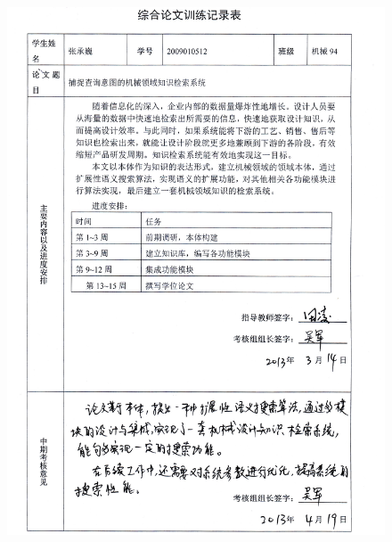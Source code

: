 \documentclass[12pt,a4paper]{article}
\begin{document}
\newpage
\begin{figure}
\centering\includegraphics[width=6in]{registerTable1.jpg} 
\end{figure}
\thispagestyle{empty}
\end{document}
